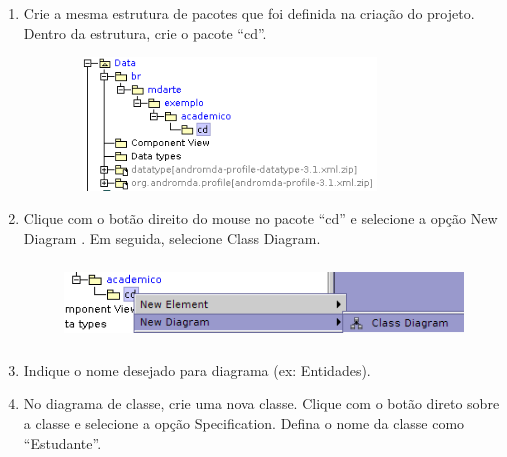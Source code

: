 \begin{enumerate}
	\item Crie a mesma estrutura de pacotes que foi definida na criação do projeto.
Dentro da estrutura, crie o pacote “cd”.
		\begin{figure}[!htb]
			\centering
			\includegraphics[width=250pt,height=100pt]{imgs/tutorial-mdarte-0000.png}
		\end{figure}
	\item Clique com o botão direito do mouse no pacote “cd” e selecione a opção New Diagram .
Em seguida, selecione Class Diagram.
		
		\begin{figure}[!htb]
			\centering
			\includegraphics[width=400pt,height=60pt]{imgs/tutorial-mdarte-0001.png}
		\end{figure}
	
	\item Indique o nome desejado para diagrama (ex: Entidades).
	
	\item No diagrama de classe, crie uma nova classe. Clique com o botão direto
	sobre a classe e selecione a opção Specification. Defina o nome da classe como “Estudante”.
	

\end{enumerate}
